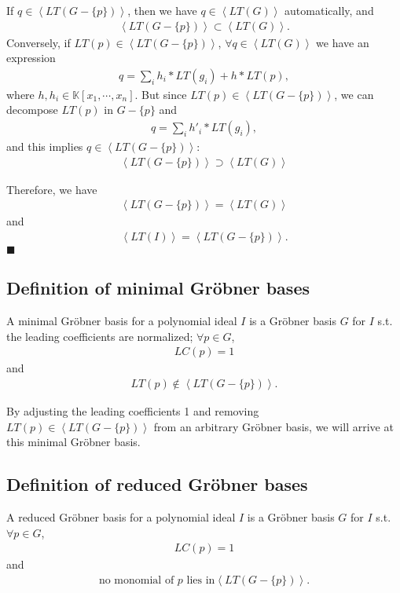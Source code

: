 \documentclass[11pt]{book}
\begin{document}
If $q \in \left< LT(G - \{p\}) \right>$, then we have $q \in \left< LT(G) \right>$ automatically, and
\begin{eqnarray}
\left< LT(G - \{p\}) \right> \subset \left<LT(G) \right>.
\end{eqnarray}
Conversely, if $LT(p) \in \left< LT(G - \{p\}) \right>$, $\forall q \in \left<LT(G) \right>$ we have an expression
\begin{eqnarray}
q = \sum_i h_i * LT(g_i) + h * LT(p), 
\end{eqnarray}
where $h,h_i \in \mathbb{K}[x_1, \cdots, x_n]$.
But since $LT(p) \in \left< LT(G - \{p\}) \right>$, we can decompose $LT(p)$ in $G - \{p\}$ and
\begin{eqnarray}
q = \sum_i h'_i * LT(g_i),
\end{eqnarray}
and this implies $q \in \left< LT(G - \{p\}) \right>$:
\begin{eqnarray}
\left< LT(G - \{p\}) \right> \supset \left<LT(G) \right>
\end{eqnarray}

Therefore, we have
\begin{eqnarray}
\left< LT(G - \{p\}) \right> = \left<LT(G) \right>
\end{eqnarray}
and
\begin{eqnarray}
\left<LT(I)\right> = \left< LT(G - \{p\}) \right>.
\end{eqnarray}
$\blacksquare$

\subsection{Definition of minimal Gr\"obner bases}
A minimal Gr\"obner basis for a polynomial ideal $I$ is a Gr\"obner basis $G$ for $I$ s.t. the leading coefficients are normalized; $\forall p \in G$,
\begin{eqnarray}
LC(p) = 1 
\end{eqnarray}
and
\begin{eqnarray}
\label{minimalCondition}
LT(p) \notin \left< LT(G - \{p\}) \right>.
\end{eqnarray}

By adjusting the leading coefficients 1 and removing $LT(p) \in \left< LT(G - \{p\}) \right>$ from an arbitrary Gr\"obner basis, we will arrive at this minimal Gr\"obner basis.

\subsection{Definition of reduced Gr\"obner bases}
A reduced Gr\"obner basis for a polynomial ideal $I$ is a Gr\"obner basis $G$ for $I$ s.t. $\forall p \in G$,
\begin{eqnarray}
LC(p) = 1
\end{eqnarray}
and
\begin{eqnarray}
\text{no monomial of $p$ lies in} \left< LT(G - \{p\}) \right>.
\end{eqnarray}
\end{document}
